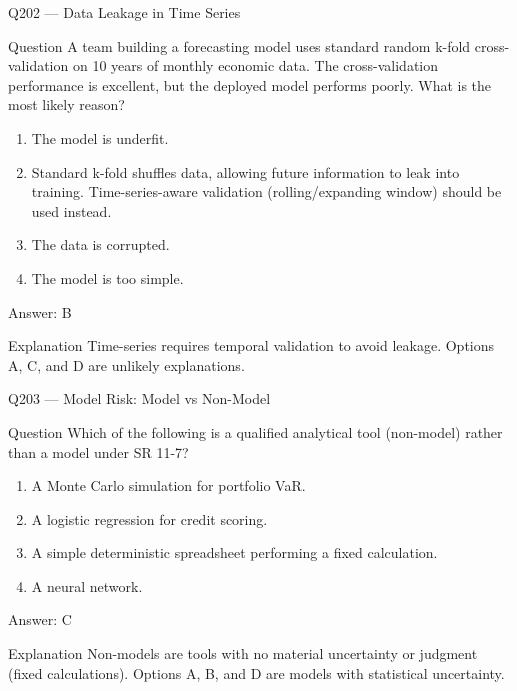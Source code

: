 \documentclass[aspectratio=169,8pt]{beamer}
\begin{document}
\begin{frame}{Q202 --- Data Leakage in Time Series}
\begin{block}{Question}
A team building a forecasting model uses standard random k-fold cross-validation on 10 years of monthly economic data. The cross-validation performance is excellent, but the deployed model performs poorly. What is the most likely reason?
\begin{enumerate}
\item The model is underfit.
\item Standard k-fold shuffles data, allowing future information to leak into training. Time-series-aware validation (rolling/expanding window) should be used instead.
\item The data is corrupted.
\item The model is too simple.
\end{enumerate}  \end{block}
\begin{exampleblock}{Answer: B}\end{exampleblock}
\begin{block}{Explanation}
Time-series requires temporal validation to avoid leakage. Options A, C, and D are unlikely explanations.
\end{block}
\end{frame}

\begin{frame}{Q203 --- Model Risk: Model vs Non-Model}
\begin{block}{Question}
Which of the following is a qualified analytical tool (non-model) rather than a model under SR 11-7?
\begin{enumerate}
\item A Monte Carlo simulation for portfolio VaR.
\item A logistic regression for credit scoring.
\item A simple deterministic spreadsheet performing a fixed calculation.
\item A neural network.
\end{enumerate}  \end{block}
\begin{exampleblock}{Answer: C}\end{exampleblock}
\begin{block}{Explanation}
Non-models are tools with no material uncertainty or judgment (fixed calculations). Options A, B, and D are models with statistical uncertainty.
\end{block}
\end{frame}
\end{document}
